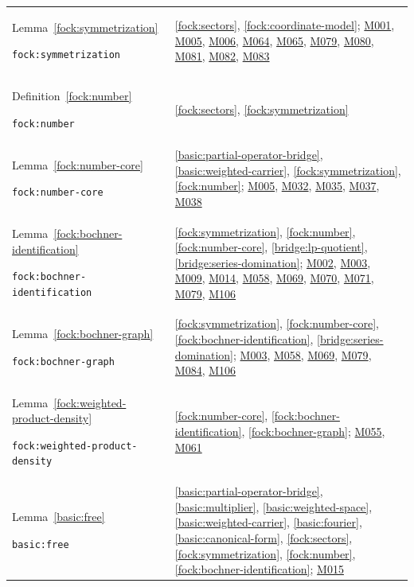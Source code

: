 \documentclass[11pt,a4paper]{article}
\theoremstyle{definition}
\theoremstyle{remark}
\begin{document}
\begin{longtable}{@{}p{}p{}@{}}
Lemma~\ref{fock:symmetrization}\par\nolinkurl{fock:symmetrization} & \ref{fock:sectors}, \ref{fock:coordinate-model}; \hyperref[base:M001]{M001}, \hyperref[base:M005]{M005}, \hyperref[base:M006]{M006}, \hyperref[base:M064]{M064}, \hyperref[base:M065]{M065}, \hyperref[base:M079]{M079}, \hyperref[base:M080]{M080}, \hyperref[base:M081]{M081}, \hyperref[base:M082]{M082}, \hyperref[base:M083]{M083} \\[4pt]
Definition~\ref{fock:number}\par\nolinkurl{fock:number} & \ref{fock:sectors}, \ref{fock:symmetrization} \\[4pt]
Lemma~\ref{fock:number-core}\par\nolinkurl{fock:number-core} & \ref{basic:partial-operator-bridge}, \ref{basic:weighted-carrier}, \ref{fock:symmetrization}, \ref{fock:number}; \hyperref[base:M005]{M005}, \hyperref[base:M032]{M032}, \hyperref[base:M035]{M035}, \hyperref[base:M037]{M037}, \hyperref[base:M038]{M038} \\[4pt]
Lemma~\ref{fock:bochner-identification}\par\nolinkurl{fock:bochner-identification} & \ref{fock:symmetrization}, \ref{fock:number}, \ref{fock:number-core}, \ref{bridge:lp-quotient}, \ref{bridge:series-domination}; \hyperref[base:M002]{M002}, \hyperref[base:M003]{M003}, \hyperref[base:M009]{M009}, \hyperref[base:M014]{M014}, \hyperref[base:M058]{M058}, \hyperref[base:M069]{M069}, \hyperref[base:M070]{M070}, \hyperref[base:M071]{M071}, \hyperref[base:M079]{M079}, \hyperref[base:M106]{M106} \\[4pt]
Lemma~\ref{fock:bochner-graph}\par\nolinkurl{fock:bochner-graph} & \ref{fock:symmetrization}, \ref{fock:number-core}, \ref{fock:bochner-identification}, \ref{bridge:series-domination}; \hyperref[base:M003]{M003}, \hyperref[base:M058]{M058}, \hyperref[base:M069]{M069}, \hyperref[base:M079]{M079}, \hyperref[base:M084]{M084}, \hyperref[base:M106]{M106} \\[4pt]
Lemma~\ref{fock:weighted-product-density}\par\nolinkurl{fock:weighted-product-density} & \ref{fock:number-core}, \ref{fock:bochner-identification}, \ref{fock:bochner-graph}; \hyperref[base:M055]{M055}, \hyperref[base:M061]{M061} \\[4pt]
Lemma~\ref{basic:free}\par\nolinkurl{basic:free} & \ref{basic:partial-operator-bridge}, \ref{basic:multiplier}, \ref{basic:weighted-space}, \ref{basic:weighted-carrier}, \ref{basic:fourier}, \ref{basic:canonical-form}, \ref{fock:sectors}, \ref{fock:symmetrization}, \ref{fock:number}, \ref{fock:bochner-identification}; \hyperref[base:M015]{M015} \\[4pt]

\end{longtable}
\end{document}
